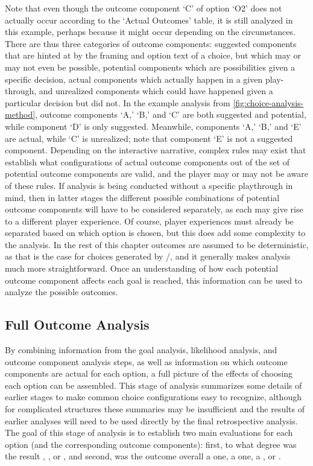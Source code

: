 Note that even though the outcome component `C' of option `O2' does not actually occur according to the `Actual Outcomes' table, it is still analyzed in this example, perhaps because it might occur depending on the circumstances.
%
There are thus three categories of outcome components: suggested components that are hinted at by the framing and option text of a choice, but which may or may not even be possible, potential components which are possibilities given a specific decision, actual components which actually happen in a given play-through, and unrealized components which could have happened given a particular decision but did not.
%
In the example analysis from \cref{fig:choice-analysis-method}, outcome components `A,' `B,' and `C' are both suggested and potential, while component `D' is only suggested.
%
Meanwhile, components `A,' `B,' and `E' are actual, while `C' is unrealized; note that component `E' is not a suggested component.
%
Depending on the interactive narrative, complex rules may exist that establish what configurations of actual outcome components out of the set of potential outcome components are valid, and the player may or may not be aware of these rules.
%
If analysis is being conducted without a specific playthrough in mind, then in latter stages the different possible combinations of potential outcome components will have to be considered separately, as each may give rise to a different player experience.
%
Of course, player experiences must already be separated based on which option is chosen, but this does add some complexity to the analysis.
%
In the rest of this chapter outcomes are assumed to be deterministic, as that is the case for choices generated by \dunyazad/, and it generally makes analysis much more straightforward.
%
Once an understanding of how each potential outcome component affects each goal is reached, this information can be used to analyze the possible outcomes.


\subsection{Full Outcome Analysis}

\label{sec:cp-full-outcome-analysis}

By combining information from the goal analysis, likelihood analysis, and outcome component analysis steps, as well as information on which outcome components are actual for each option, a full picture of the effects of choosing each option can be assembled.
%
This stage of analysis summarizes some details of earlier stages to make common choice configurations easy to recognize, although for complicated structures these summaries may be insufficient and the results of earlier analyses will need to be used directly by the final retrospective analysis.
%
The goal of this stage of analysis is to establish two main evaluations for each option (and the corresponding outcome components): first, to what degree was the result , , or , and second, was the outcome overall a  one, a  one, a , or .


